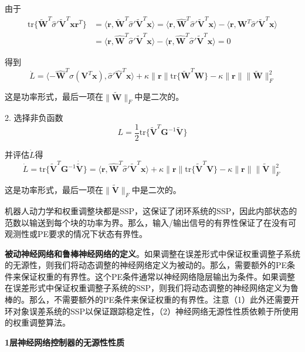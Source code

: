 \documentclass[12pt,a4paper]{ctexart}
\begin{document}
由于
\begin{align}
\text{tr}\{\tilde{\bm{W}}^T\hat{\sigma}'\tilde{\bm{V}}^T\bm{x}\bm{r}^T\} &= \langle \bm{r}, \tilde{\bm{W}}^T\hat{\sigma}'\tilde{\bm{V}}^T\bm{x} \rangle = \langle \bm{r}, \hat{\bm{W}}^T\hat{\sigma}'\tilde{\bm{V}}^T\bm{x} \rangle - \langle \bm{r}, \bm{W}^T\hat{\sigma}'\tilde{\bm{V}}^T\bm{x} \rangle \\
&= \langle \bm{r}, \hat{\bm{W}}^T\hat{\sigma}'\tilde{\bm{V}}^T\bm{x} \rangle - \langle \bm{r}, \hat{\bm{W}}^T\hat{\sigma}'\tilde{\bm{V}}^T\bm{x} \rangle = 0
\end{align}

得到
\begin{equation}
\dot{L} = \langle -\hat{\bm{W}}^T\sigma(\bm{V}^T\bm{x}), \hat{\sigma}'\hat{\bm{V}}^T\bm{x} \rangle + \kappa\|\bm{r}\|\text{tr}\{\tilde{\bm{W}}^T\bm{W}\} - \kappa\|\bm{r}\|\|\tilde{\bm{W}}\|_F^2
\end{equation}

这是功率形式，最后一项在$\|\tilde{\bm{W}}\|_F$中是二次的。

2. 选择非负函数
\begin{equation}
L = \frac{1}{2}\text{tr}\{\tilde{\bm{V}}^T \bm{G}^{-1} \tilde{\bm{V}}\}
\end{equation}

并评估$\dot{L}$得
\begin{equation}
\dot{L} = \text{tr}\{\tilde{\bm{V}}^T \bm{G}^{-1} \dot{\tilde{\bm{V}}}\} = \langle \bm{r}, \hat{\bm{W}}^T\hat{\sigma}'\tilde{\bm{V}}^T\bm{x} \rangle + \kappa\|\bm{r}\|\text{tr}\{\tilde{\bm{V}}^T\bm{V}\} - \kappa\|\bm{r}\|\|\tilde{\bm{V}}\|_F^2
\end{equation}

这是功率形式，最后一项在$\|\tilde{\bm{V}}\|_F$中是二次的。

机器人动力学和权重调整块都是SSP，这保证了闭环系统的SSP，因此内部状态的范数以输送到每个块的功率为界。那么，输入/输出信号的有界性保证了在没有可观测性或PE要求的情况下状态有界性。

\textbf{被动神经网络和鲁棒神经网络的定义}。如果调整在误差形式中保证权重调整子系统的无源性，则我们将动态调整的神经网络定义为被动的。那么，需要额外的PE条件来保证权重的有界性。这个PE条件通常以神经网络隐层输出为条件。如果调整在误差形式中保证权重调整子系统的SSP，则我们将动态调整的神经网络定义为鲁棒的。那么，不需要额外的PE条件来保证权重的有界性。注意（1）此外还需要开环对象误差系统的SSP以保证跟踪稳定性，（2）神经网络无源性性质依赖于所使用的权重调整算法。

\textbf{1层神经网络控制器的无源性性质}
\end{document}
